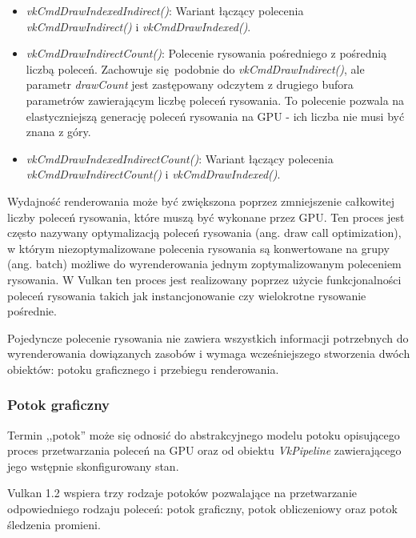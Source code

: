 \begin{itemize}
	\item \textit{vkCmdDrawIndexedIndirect()}: Wariant łączący polecenia \textit{vkCmdDrawIndirect()} i \textit{vkCmdDrawIndexed()}.
	
	\item \textit{vkCmdDrawIndirectCount()}: Polecenie rysowania pośredniego z pośrednią liczbą poleceń.
	Zachowuje się podobnie do \textit{vkCmdDrawIndirect()}, ale parametr \textit{drawCount} jest zastępowany odczytem z drugiego bufora parametrów zawierającym liczbę poleceń rysowania.
	To polecenie pozwala na elastyczniejszą generację poleceń rysowania na GPU - ich liczba nie musi być znana z góry.
	
	\item \textit{vkCmdDrawIndexedIndirectCount()}: Wariant łączący polecenia \textit{vkCmdDrawIndirectCount()} i \textit{vkCmdDrawIndexed()}.
\end{itemize}


Wydajność renderowania może być zwiększona poprzez zmniejszenie całkowitej liczby poleceń rysowania, które muszą być wykonane przez GPU. Ten proces jest często nazywany optymalizacją poleceń rysowania (ang. draw call optimization), w którym niezoptymalizowane polecenia rysowania są konwertowane na grupy (ang. batch) możliwe do wyrenderowania jednym zoptymalizowanym poleceniem rysowania.
W Vulkan ten proces jest realizowany poprzez użycie funkcjonalności poleceń rysowania takich jak instancjonowanie czy wielokrotne rysowanie pośrednie.

Pojedyncze polecenie rysowania nie zawiera wszystkich informacji potrzebnych do wyrenderowania dowiązanych zasobów i wymaga wcześniejszego stworzenia dwóch obiektów: potoku graficznego i przebiegu renderowania.


\subsubsection{Potok graficzny}

Termin ,,potok'' może się odnosić do abstrakcyjnego modelu potoku opisującego proces przetwarzania poleceń na GPU oraz od obiektu \textit{VkPipeline} zawierającego jego wstępnie skonfigurowany stan.

Vulkan 1.2 wspiera trzy rodzaje potoków pozwalające na przetwarzanie odpowiedniego rodzaju poleceń: potok graficzny, potok obliczeniowy oraz potok śledzenia promieni.

